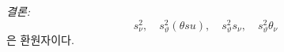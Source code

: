 
\noindent\emph{결론:}
\[
 s_\nu^2,\quad s_\vartheta^2(\theta su),\quad s_\vartheta^2s_\nu,\quad s_\vartheta^2\theta_\nu
\]
은 환원자이다.

